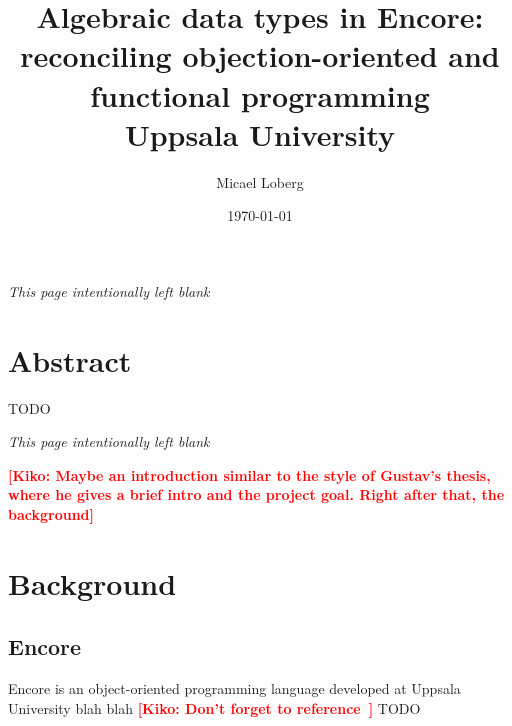 \documentclass[10pt]{report}
\title{
    {Algebraic data types in Encore:}\\
    {reconciling objection-oriented and functional programming}\\
    {Uppsala University}
}
\author{Micael Loberg}
\date{\today}
\newcommand{\KIKO}[1]{\textcolor{red}{\textbf{[Kiko: #1]}}}
\begin{document}

\maketitle

\newpage\newpage
{\centering \textit{This page intentionally left blank}\par}
\vspace{\fill}


\chapter*{Abstract}
TODO

\newpage\newpage
{\centering \textit{This page intentionally left blank}\par}
\vspace{\fill}


\tableofcontents

\KIKO{Maybe an introduction similar to the style of Gustav's thesis, where
he gives a brief intro and the project goal. Right after that, the background}

%
\chapter{Background}
%
\setcounter{page}{1}

%
\label{ch:background}
%

\section{Encore}
Encore is an object-oriented programming language developed at Uppsala University blah blah
\KIKO{Don't forget to reference~\cite{brandauer:2015:POM}}
TODO
\end{document}
